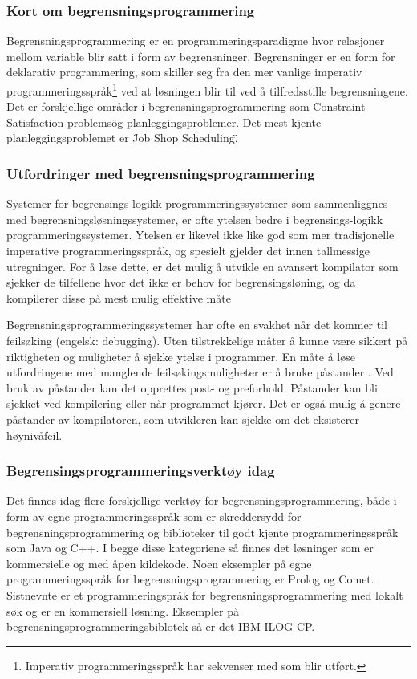 \subsubsection{Kort om begrensningsprogrammering}
Begrensningsprogrammering er en programmeringsparadigme hvor relasjoner mellom variable blir satt i form av begrensninger. Begrensninger er en form for deklarativ programmering, som skiller seg fra den mer vanlige imperativ programmeringsspråk\footnote{Imperativ programmeringsspråk har sekvenser med som blir utført.} ved at løsningen blir til ved å tilfredsstille begrensningene. Det er forskjellige områder i begrensningsprogrammering som \"Constraint Satisfaction problems\" og planleggingsproblemer. Det mest kjente planleggingsproblemet er \"Job Shop Scheduling\".\cite{cpwikipedia}

\subsubsection{Utfordringer med begrensningsprogrammering}
Systemer for begrensings-logikk programmeringssystemer som sammenliggnes med begrensningsløsningssystemer, er ofte ytelsen bedre i begrensings-logikk programmeringssystemer. Ytelsen er likevel ikke like god som mer tradisjonelle imperative programmeringsspråk, og spesielt gjelder det innen tallmessige utregninger. For å løse dette, er det mulig å utvikle en avansert kompilator som sjekker de tilfellene hvor det ikke er behov for begrensingsløning, og da kompilerer disse på mest mulig effektive måte \cite{challengesManuel}

Begrensningsprogrammeringssystemer har ofte en svakhet når det kommer til feilsøking (engelsk: debugging). Uten tilstrekkelige måter å kunne være sikkert på riktigheten og muligheter å sjekke ytelse i programmer. En måte å løse utfordringene med manglende feilsøkingsmuligheter er å bruke påstander . Ved bruk av påstander kan det opprettes post- og preforhold. Påstander kan bli sjekket ved kompilering eller når programmet kjører. Det er også mulig å genere påstander av kompilatoren, som utvikleren kan sjekke om det eksisterer høynivåfeil\cite{challengesManuel}.

\subsubsection{Begrensingsprogrammeringsverktøy idag}
Det finnes idag flere forskjellige verktøy for begrensningsprogrammering, både i form av egne programmeringsspråk som er skreddersydd for begrensningsprogrammering og biblioteker til godt kjente programmeringsspråk som Java og C++. I begge disse kategoriene så finnes det løsninger som er kommersielle og med åpen kildekode. Noen eksempler på egne programmeringsspråk for begrensningsprogrammering er Prolog og Comet. Sistnevnte er et programmeringspråk for begrensningsprogrammering med lokalt søk og er en kommersiell løsning. Eksempler på begrensningsprogrammeringsbiblotek så er det IBM ILOG CP.

